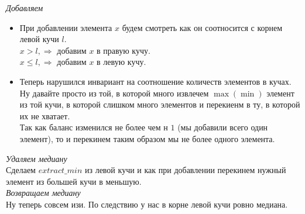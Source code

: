 \documentclass[14pt,a4paper,report]{ncc}
\begin{document}
\textit{Добавляем}
\begin{itemize}
    \item {
        При добавлении элемента $x$ будем смотреть как он соотносится с корнем левой кучи $l$.\\
        $x > l, \Rightarrow$ добавим $x$ в правую кучу.\\
        $x \leq l, \Rightarrow$ добавим $x$ в левую кучу.\\

    }
    \item {
        Теперь нарушился инвариант на соотношение количеств элементов в кучах.
        Ну давайте просто из той, в которой много извлечем $\operatorname{max}(\operatorname{min})$ элемент из той кучи, в которой слишком много элементов и перекиенм в ту, в которой их не хватает.\\
        Так как баланс изменился не более чем н $1$ (мы добавили всего один элемент), то и перекинем таким образом мы не более одного элемента.
    }
\end{itemize}

\textit{Удаляем медиану}\\
Сделаем $extract\_min$ из левой кучи и как при добавлении перекинем нужный элемент из большей кучи в меньшую.\\

\textit{Возвращаем медиану}\\
Ну теперь совсем изи. По следствию у нас в корне левой кучи ровно медиана.
\end{document}
